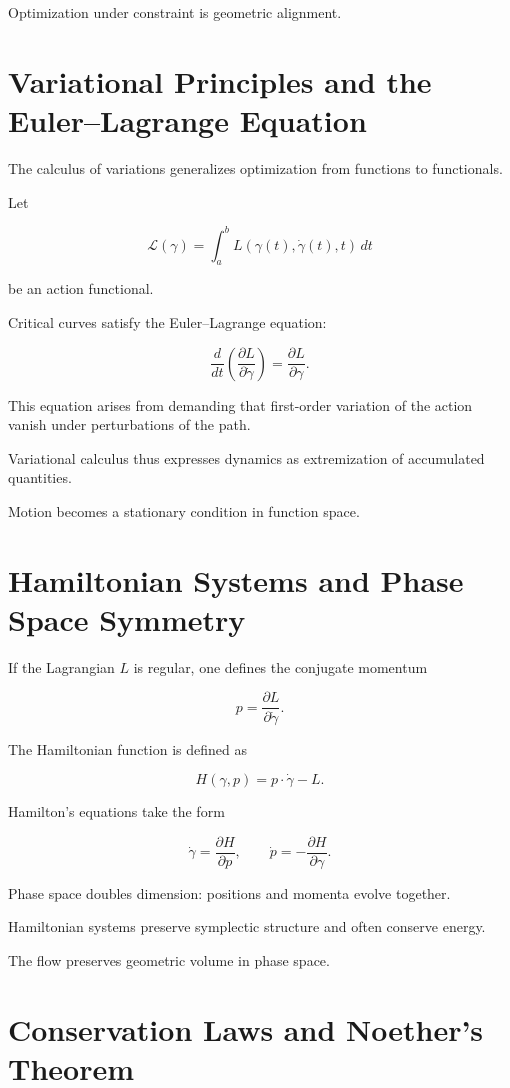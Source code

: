 \documentclass[12pt]{book}
\begin{document}
Optimization under constraint is geometric alignment.

\section{Variational Principles and the Euler--Lagrange Equation}

The calculus of variations generalizes optimization from functions to functionals.

Let

\[
\mathcal{L}(\gamma)
=
\int_a^b L(\gamma(t), \dot{\gamma}(t), t)\, dt
\]

be an action functional.

Critical curves satisfy the Euler--Lagrange equation:

\[
\frac{d}{dt} \left( \frac{\partial L}{\partial \dot{\gamma}} \right)
=
\frac{\partial L}{\partial \gamma}.
\]

This equation arises from demanding that first-order variation of the action vanish under perturbations of the path.

Variational calculus thus expresses dynamics as extremization of accumulated quantities.

Motion becomes a stationary condition in function space.

\section{Hamiltonian Systems and Phase Space Symmetry}

If the Lagrangian $L$ is regular, one defines the conjugate momentum

\[
p = \frac{\partial L}{\partial \dot{\gamma}}.
\]

The Hamiltonian function is defined as

\[
H(\gamma, p)
=
p \cdot \dot{\gamma} - L.
\]

Hamilton's equations take the form

\[
\dot{\gamma} = \frac{\partial H}{\partial p},
\qquad
\dot{p} = - \frac{\partial H}{\partial \gamma}.
\]

Phase space doubles dimension: positions and momenta evolve together.

Hamiltonian systems preserve symplectic structure and often conserve energy.

The flow preserves geometric volume in phase space.

\section{Conservation Laws and Noether's Theorem}
\end{document}
